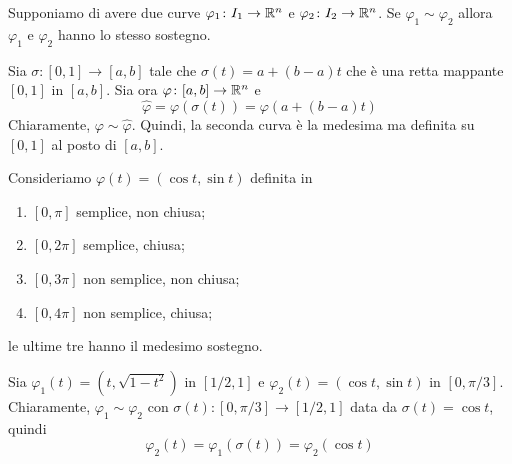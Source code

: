 \documentclass[a4paper]{article}
\begin{document}
\begin{radioactive}
\begin{snippetproposition}{}
    Supponiamo di avere due curve \(\varphi_1 \colon I_1 \to \mathbb{R}^n\)
    e \(\varphi_2 \colon I_2 \to \mathbb{R}^n\). Se \(\varphi_1 \sim \varphi_2\) allora
    \(\varphi_1\) e \(\varphi_2\) hanno lo stesso sostegno.
\end{snippetproposition}
\end{radioactive}

\begin{radioactive}
\begin{snippetexample}{}
    Sia \(\sigma \colon [0,1] \to [a,b]\) tale che \(\sigma(t) = a + (b-a)t\)
    che è una retta mappante \([0,1]\) in \([a,b]\).
    Sia ora \(\varphi \colon [a,b] \to \mathbb{R}^n\)
    e
    \[
        \hat{\varphi} = \varphi(\sigma(t)) = \varphi(a + (b-a)t)
    \]
    Chiaramente, \(\varphi \sim \hat{\varphi}\).
    Quindi, la seconda curva è la medesima ma definita su \([0,1]\) al posto di \([a,b]\).
\end{snippetexample}
\end{radioactive}

\begin{radioactive}
\begin{snippetexample}{}
    Consideriamo \(\varphi(t) = (\cos t, \sin t)\) definita in
    \begin{enumerate}
        \item \([0, \pi]\) semplice, non chiusa;
        \item \([0, 2\pi]\) semplice, chiusa;
        \item \([0, 3\pi]\) non semplice, non chiusa;
        \item \([0, 4\pi]\) non semplice, chiusa;
    \end{enumerate}
    le ultime tre hanno il medesimo sostegno.
\end{snippetexample}
\end{radioactive}

\begin{radioactive}
\begin{snippetexample}{}
    Sia \(\varphi_1(t) = (t, \sqrt{1-t^2})\) in \([1/2, 1]\)
    e \(\varphi_2(t) = (\cos t, \sin t)\) in \([0, \pi/3]\).
    Chiaramente, \(\varphi_1 \sim \varphi_2\) con \(\sigma(t) \colon [0, \pi/3] \to [1/2, 1]\)
    data da \(\sigma(t) = \cos t\), quindi
    \[
        \varphi_2(t) = \varphi_1(\sigma(t))
        = \varphi_2(\cos t)
    \]
\end{snippetexample}
\end{radioactive}
\end{document}
